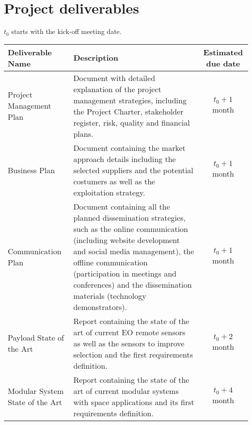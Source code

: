 \clearpage
\section{Project deliverables}

$t_0$ starts with the kick-off meeting date.
\begin{longtable}[H]{>{\raggedright\arraybackslash}p{4cm} p{8cm} c}
	
	\toprule[2pt]
	
	\textbf{Deliverable Name} & \textbf{Description} & \textbf{Estimated due date}  \\
	
	\midrule[1.5pt] 
	\endhead
	
	Project Management Plan & Document with detailed explanation of the project management strategies, including the Project Charter, stakeholder register, risk, quality and financial plans.& $t_0 + 1$ month\vspace{0.2cm} \\
	
	\midrule
	
	Business Plan & Document containing the market approach details including the selected suppliers and the potential costumers as well as the exploitation strategy.&$t_0 + 1$ month\vspace{0.2cm} \\
	
	\midrule
	
	Communication Plan  & Document containing all the planned dissemination strategies, such as the online communication (including website development and social media management), the offline communication (participation in meetings and conferences) and the dissemination materials (technology demonstrators).&$t_0 + 1$ month\vspace{0.2cm} \\
	
	\midrule
	
	Payload State of the Art  & Report containing the state of the art of current EO remote sensors as well as the sensors to improve selection and the first requirements definition.&$t_0 + 2$ month\vspace{0.2cm} \\
	
	\midrule
	
	Modular System State of the Art  & Report containing the state of the art of current modular systems with space applications and its first requirements definition.&$t_0 + 4$ month\vspace{0.2cm} \\
	

\end{longtable}
